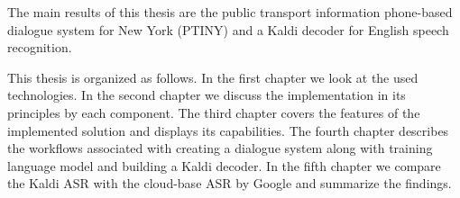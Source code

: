The main results of this thesis are the public transport information phone-based dialogue system for New York (\ac{PTINY}) and a Kaldi decoder for English speech recognition.

This thesis is organized as follows.
In the first chapter we look at the used technologies.
In the second chapter we discuss the implementation in its principles by each component. %
The third chapter covers the features of the implemented solution and displays its capabilities.
The fourth chapter describes the workflows associated with creating a dialogue system along with training language model and building a Kaldi decoder.
In the fifth chapter we compare the Kaldi \ac{ASR} with the cloud-base \ac{ASR} by Google and summarize the findings.
















